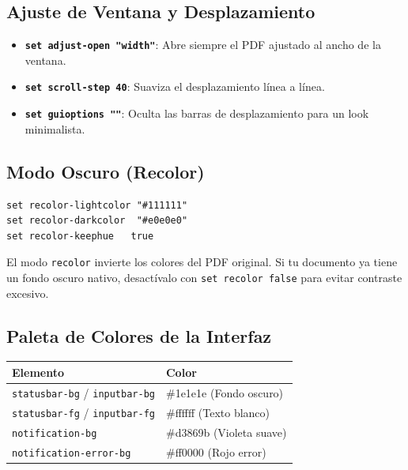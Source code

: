 \documentclass[11pt,article,spanish]{apuntes-scr}
\begin{document}
\subsection{Ajuste de Ventana y Desplazamiento}
\begin{itemize}[leftmargin=*]
    \item \textbf{\texttt{set adjust-open "width"}}: Abre siempre el PDF ajustado al ancho de la ventana.
    \item \textbf{\texttt{set scroll-step 40}}: Suaviza el desplazamiento línea a línea.
    \item \textbf{\texttt{set guioptions ""}}: Oculta las barras de desplazamiento para un look minimalista.
\end{itemize}

\subsection{Modo Oscuro (Recolor)}
\begin{lstlisting}[language=TeX, basicstyle=\ttfamily\footnotesize, frame=single, backgroundcolor=\color{gray!5}]
set recolor-lightcolor "#111111"
set recolor-darkcolor  "#e0e0e0"
set recolor-keephue   true
\end{lstlisting}

\begin{warningbox}[Advertencia]
  El modo \texttt{recolor} invierte los colores del PDF original. Si tu documento ya tiene un fondo oscuro nativo, desactívalo con \texttt{set recolor false} para evitar contraste excesivo.
\end{warningbox}

\subsection{Paleta de Colores de la Interfaz}
\begin{center}
\small
\begin{tabularx}{\linewidth}{l X}
\toprule
\textbf{Elemento} & \textbf{Color} \\
\midrule
\texttt{statusbar-bg} / \texttt{inputbar-bg} & \#1e1e1e (Fondo oscuro) \\
\texttt{statusbar-fg} / \texttt{inputbar-fg} & \#ffffff (Texto blanco) \\
\texttt{notification-bg} & \#d3869b (Violeta suave) \\
\texttt{notification-error-bg} & \#ff0000 (Rojo error) \\
\bottomrule
\end{tabularx}
\end{center}
\end{document}
